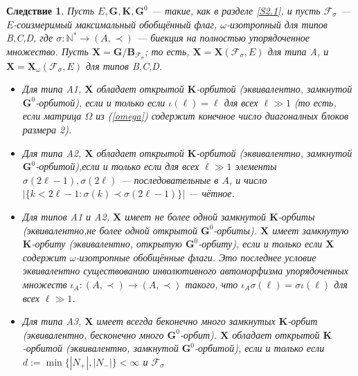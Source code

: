 \documentclass{amsart}
\newtheorem{corollary}{Следствие}
\theoremstyle{definition}
\newcommand{\bs}[1]{\boldsymbol{#1}}
\begin{document}
\begin{corollary}
\label{C3}
Пусть $E,\mathbf{G},\mathbf{K},\mathbf{G}^0$ --- такие, как в разделе \ref{S2.1},
и пусть $\mathcal{F}_\sigma$ --- $E$-соизмеримый максимальный обобщённый флаг, $\omega$-изотропный для типов B,C,D, где $\sigma:\mathbb{N}^*\to (A,\prec)$ --- биекция на полностью упорядоченное множество.
Пусть $\mathbf{X}=\mathbf{G}/\mathbf{B}_{\mathcal{F}_\sigma}$; то есть, $\mathbf{X}=\mathbf{X}(\mathcal{F}_\sigma,E)$ для типа A, и $\mathbf{X}=\mathbf{X}_\omega(\mathcal{F}_\sigma,E)$ для типов B,C,D.

\begin{itemize}
\item[\rm ($\mbox{a}_1$)] Для типа A1,
$\mathbf{X}$ обладает открытой $\mathbf{K}$-орбитой (эквивалентно, замкнутой $\mathbf{G}^0$-орбитой), если и только если $\iota(\ell)=\ell$ для всех $\ell\gg 1$ (то есть, если матрица $\Omega$ из (\ref{omega}) содержит конечное число диагоналных блоков размера 2).%
\item[\rm ($\mbox{a}_2$)]
Для типа A2, $\mathbf{X}$ обладает открытой $\mathbf{K}$-орбитой (эквивалентно, замкнутой $\mathbf{G}^0$-орбитой),если и только если
для всех $\ell\gg 1$ элементы
$\sigma(2\ell-1),\sigma(2\ell)$ --- последовательные в  $A$, и
число $|\{k<2\ell-1:\sigma(k)\prec\sigma(2\ell-1)\}|$ --- чётное.
\item[\rm ($\mbox{a}'_{12}$)]
Для типов A1 и A2,
$\mathbf{X}$ имеет не более одной замкнутой $\mathbf{K}$-орбиты
(эквивалентно,не более одной открытой $\mathbf{G}^0$-орбиты).  $\mathbf{X}$ имеет замкнутую $\mathbf{K}$-орбиту (эквивалентно, открытую $\mathbf{G}^0$-орбиту), если и только если $\mathbf{X}$ содержит $\omega$-изотропные обобщённые флаги. Это последнее условие эквивалентно существованию инволютивного автоморфизма упорядоченных множеств $\iota_A:(A,\prec)\to(A,\prec)$ такого, что
$\iota_A\sigma(\ell)=\sigma\iota(\ell)$ для всех $\ell\gg 1$.
\item[\rm ($\mbox{a}_3$)] Для типа A3,
$\mathbf{X}$ имеет всегда беконечно много замкнутых $\mathbf{K}$-орбит (эквивалентно, бесконечно много $\mathbf{G}^0$-орбит).
$\mathbf{X}$ обладает открытой $\mathbf{K}$-орбитой (эквивалентно, замкнутой $\mathbf{G}^0$-орбитой),
если и только если $d:=\min\{|N_+|,|N_-|\}<\infty$ и $\mathcal{F}_\sigma$

\end{itemize}
\end{corollary}
\end{document}
